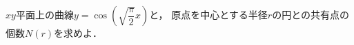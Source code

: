 \documentclass[../../main.tex]{subfiles}
\begin{document}
$xy$平面上の曲線$\displaystyle y=\cos\left( \sqrt{\dfrac{\pi}{2}}x \right)$と，
原点を中心とする半径$r$の円との共有点の個数$N(r)$を求めよ．
\end{document}

